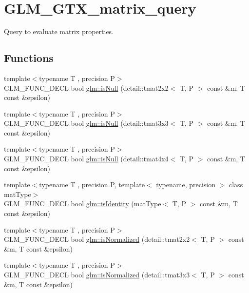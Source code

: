 \hypertarget{group__gtx__matrix__query}{\section{G\-L\-M\-\_\-\-G\-T\-X\-\_\-matrix\-\_\-query}
\label{group__gtx__matrix__query}
}


Query to evaluate matrix properties.  


\subsection*{Functions}
\begin{DoxyCompactItemize}
\item 
{\footnotesize template$<$typename T , precision P$>$ }\\G\-L\-M\-\_\-\-F\-U\-N\-C\-\_\-\-D\-E\-C\-L bool \hyperlink{group__gtx__matrix__query_gaf7e38680b67a3589a262d281660e4694}{glm\-::is\-Null} (detail\-::tmat2x2$<$ T, P $>$ const \&m, T const \&epsilon)
\item 
{\footnotesize template$<$typename T , precision P$>$ }\\G\-L\-M\-\_\-\-F\-U\-N\-C\-\_\-\-D\-E\-C\-L bool \hyperlink{group__gtx__matrix__query_ga7a6ef9f174fec0224214ff5ba6c27ba4}{glm\-::is\-Null} (detail\-::tmat3x3$<$ T, P $>$ const \&m, T const \&epsilon)
\item 
{\footnotesize template$<$typename T , precision P$>$ }\\G\-L\-M\-\_\-\-F\-U\-N\-C\-\_\-\-D\-E\-C\-L bool \hyperlink{group__gtx__matrix__query_ga5b8d7b0c7bf1d48ff8df10321440a61a}{glm\-::is\-Null} (detail\-::tmat4x4$<$ T, P $>$ const \&m, T const \&epsilon)
\item 
{\footnotesize template$<$typename T , precision P, template$<$ typename, precision $>$ class mat\-Type$>$ }\\G\-L\-M\-\_\-\-F\-U\-N\-C\-\_\-\-D\-E\-C\-L bool \hyperlink{group__gtx__matrix__query_gafc1ce12c738b8c5d007179e615609330}{glm\-::is\-Identity} (mat\-Type$<$ T, P $>$ const \&m, T const \&epsilon)
\item 
{\footnotesize template$<$typename T , precision P$>$ }\\G\-L\-M\-\_\-\-F\-U\-N\-C\-\_\-\-D\-E\-C\-L bool \hyperlink{group__gtx__matrix__query_gaae7339fac94c86ed741f20b6915682ab}{glm\-::is\-Normalized} (detail\-::tmat2x2$<$ T, P $>$ const \&m, T const \&epsilon)
\item 
{\footnotesize template$<$typename T , precision P$>$ }\\G\-L\-M\-\_\-\-F\-U\-N\-C\-\_\-\-D\-E\-C\-L bool \hyperlink{group__gtx__matrix__query_gab4c4106cd851951bad5e78a83bfc75dd}{glm\-::is\-Normalized} (detail\-::tmat3x3$<$ T, P $>$ const \&m, T const \&epsilon)

\end{DoxyCompactItemize}
